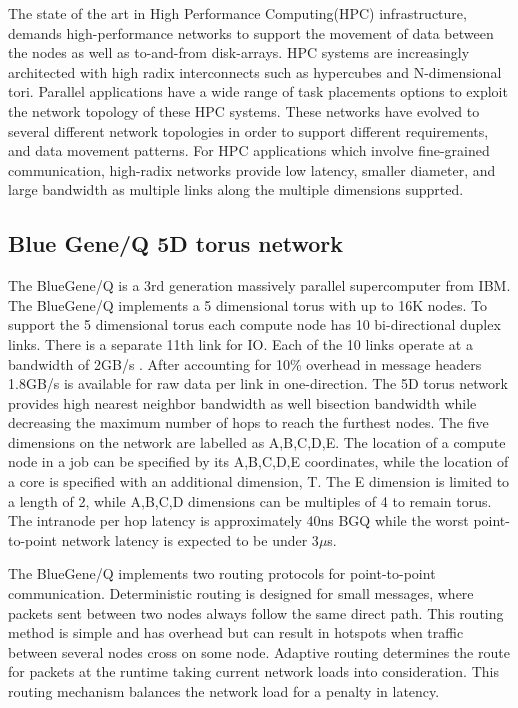 \documentclass{acm_proc_article-sp}
\begin{document}
The state of the art in High Performance Computing(HPC) infrastructure, demands high-performance networks
to support the movement of data between the nodes as well as to-and-from disk-arrays. HPC systems are
increasingly architected with high radix interconnects such as hypercubes and N-dimensional tori.
Parallel applications have a wide range of task placements options to exploit the network topology of
these HPC systems. These networks have evolved to several different network topologies in order to support
different requirements, and data movement patterns. For HPC applications which involve fine-grained communication,
high-radix networks provide low latency, smaller diameter, and large bandwidth as multiple links along the multiple
dimensions supprted.

\subsection{Blue Gene/Q 5D torus network}

The BlueGene/Q is a 3rd generation massively parallel supercomputer from IBM. The BlueGene/Q implements a 5 dimensional torus with up to 16K nodes.
To support the 5 dimensional torus each compute node has 10 bi-directional duplex links. There is a separate 11th link for IO. Each of the 10 links
operate at a bandwidth of 2GB/s \cite{BGQ_RedBook_2013}. After accounting for 10\% overhead in message headers 1.8GB/s is available for raw data per link in one-direction.
The 5D torus network provides high nearest neighbor bandwidth as well bisection bandwidth while decreasing the maximum number of hops to reach
the furthest nodes. The five dimensions on the network are labelled as
A,B,C,D,E.  The location of a compute node in a job can be specified
by its A,B,C,D,E coordinates, while the location of a core is specified
with an additional dimension, T. The E dimension is limited to a length
of 2, while A,B,C,D dimensions can be multiples of 4 to remain torus.
  The intranode per hop latency is approximately 40ns BGQ \cite{BGQ_Interconnect_2012}
while the worst point-to-point network latency is expected to be under 3$\mu$s. 

The BlueGene/Q implements two routing protocols for point-to-point communication.
Deterministic routing is designed for small messages, where packets sent between two nodes always follow the same direct path.
This routing method is simple and has overhead but can result in hotspots
when traffic between several nodes cross on some node.
Adaptive routing determines the route for packets at the runtime taking current network loads into consideration.
This routing mechanism balances the network load for a penalty in latency.
\end{document}
